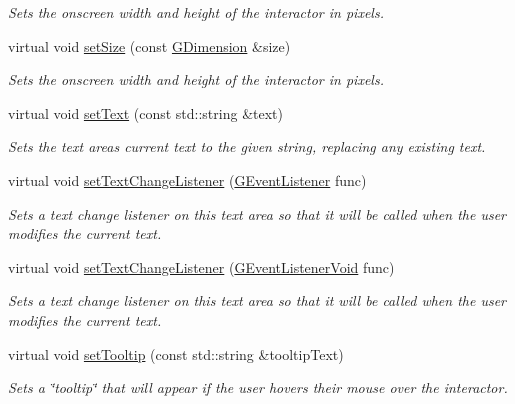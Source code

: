 \begin{DoxyCompactItemize}
\begin{DoxyCompactList}\small\item\em Sets the onscreen width and height of the interactor in pixels. \end{DoxyCompactList}\item 
virtual void \mbox{\hyperlink{classsgl_1_1GInteractor_ae2b628228f192c2702c4ce941b2af68f}{set\+Size}} (const \mbox{\hyperlink{structsgl_1_1GDimension}{G\+Dimension}} \&size)
\begin{DoxyCompactList}\small\item\em Sets the onscreen width and height of the interactor in pixels. \end{DoxyCompactList}\item 
virtual void \mbox{\hyperlink{classsgl_1_1GTextArea_ac1ae51949d41ee9054634be5967d91b8}{set\+Text}} (const std\+::string \&text)
\begin{DoxyCompactList}\small\item\em Sets the text area\textquotesingle{}s current text to the given string, replacing any existing text. \end{DoxyCompactList}\item 
virtual void \mbox{\hyperlink{classsgl_1_1GTextArea_ae41284f9c540110180ac0ad6beca5cb0}{set\+Text\+Change\+Listener}} (\mbox{\hyperlink{namespacesgl_ae9f3e9eab70035da1a2b114e21357b25}{G\+Event\+Listener}} func)
\begin{DoxyCompactList}\small\item\em Sets a text change listener on this text area so that it will be called when the user modifies the current text. \end{DoxyCompactList}\item 
virtual void \mbox{\hyperlink{classsgl_1_1GTextArea_ae8df75b0746951146d29220f386fcd33}{set\+Text\+Change\+Listener}} (\mbox{\hyperlink{namespacesgl_a54427ce97bb1c2804e4fe2b0a62e8b17}{G\+Event\+Listener\+Void}} func)
\begin{DoxyCompactList}\small\item\em Sets a text change listener on this text area so that it will be called when the user modifies the current text. \end{DoxyCompactList}\item 
virtual void \mbox{\hyperlink{classsgl_1_1GInteractor_a039e0e49beaecc275efce02d416acea8}{set\+Tooltip}} (const std\+::string \&tooltip\+Text)
\begin{DoxyCompactList}\small\item\em Sets a \char`\"{}tooltip\char`\"{} that will appear if the user hovers their mouse over the interactor. \end{DoxyCompactList}\item 

\end{DoxyCompactItemize}

